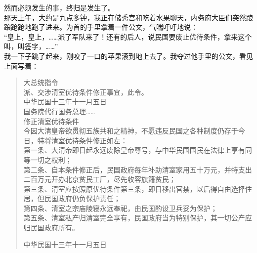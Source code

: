 然而必须发生的事，终归是发生了。\\

那天上午，大约是九点多钟，我正在储秀宫和吃着水果聊天，内务府大臣们突然踉踉跄跄地跑了进来。为首的手里拿着一件公文，气喘吁吁地说：\\

“皇上，皇上，……派了军队来了！还有的后人，说民国要废止优待条件，拿来这个叫，叫签字，……”\\

我一下子跳了起来，刚咬了一口的苹果滚到地上去了。我夺过他手里的公文，看见上面写着：\\

\begin{quote}
	大总统指令\\

派、交涉清室优待条件修正事宜，此令。\\

中华民国十三年十一月五日\\

国务院代行国务总理……\\

修正清室优待条件\\

今因大清皇帝欲贯彻五族共和之精神，不愿违反民国之各种制度仍存于今日，特将清室优待条件修正如左：\\

第一条、大清帝即日起永远废除皇帝尊号，与中华民国国民在法律上享有同等一切之权利；\\

第二条、自本条件修正后，民国政府每年补助清室家用五十万元，并特支出二百万元开办北京贫民工厂，尽先收容旗籍贫民；\\

第三条、清室应按照原优待条件第三条，即日移出官禁，以后得自由选择住居，但民国政府仍负保护责任；\\

第四条、清室之宗庙陵寝永远奉祀，由民国酌设卫兵妥为保护；\\

第五条、清室私产归清室完全享有，民国政府当为特别保护，其一切公产应归民国政府所有。\\

\begin{flushright}
	中华民国十三年十一月五日
\end{flushright}
\end{quote}

